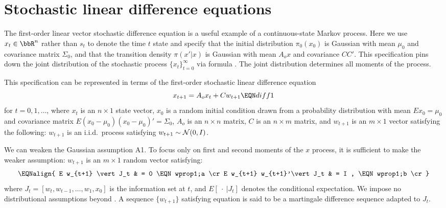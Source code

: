 \section{Stochastic linear difference equations}\label{sec:stochlinear}%
   The first-order linear vector stochastic difference equation
is a  useful example of a continuous-state Markov process.
Here we  use
$x_t \in {\bbR}^n$   rather than $s_t$ to denote the time $t$ state
and
specify that the initial distribution   $\pi_0(x_0)$ is Gaussian with mean
$\mu_0$ and covariance matrix $\Sigma_0$, and that
the transition density $\pi(x'|x) $ is Gaussian with
mean $A_o x$ and covariance $C C'$.
This specification pins down the joint distribution of the
stochastic process $\{x_t\}_{t=0}^\infty$ via formula
.
The joint distribution determines
all  moments of the process.

This specification can be represented in terms of
the first-order stochastic linear difference equation
$$ x_{t+1} = A_o x_t + C  w_{t+1} \EQN diff1 $$
for $t = 0, 1 ,\ldots$,
where $x_t$ is an $n \times 1$ state vector, $x_0$ is a random
initial condition drawn from a probability distribution with mean $E x_0 = \mu_0$
and covariance matrix $E (x_0 - \mu_0)(x_0 - \mu_0)' = \Sigma_0$,
$A_o$ is an $n \times n$ matrix, $C$ is an $n \times m$
matrix, and  $w_{t+1}$ is an $m \times 1$   vector satisfying
 the following:
\medskip
{}  $w_{t+1}$ is an  i.i.d.\ process satisfying
 $w_{t+1} \sim {\cal N}(0, I)$.

\medskip

We can weaken the Gaussian assumption A1.
 To focus only on first and second moments of the $x$ process,
it is sufficient to make the weaker assumption:
\medskip
{} $w_{t+1}$ is an $m \times 1$ random vector
satisfying:
$$ \EQNalign{ E w_{t+1} \vert J_t & = 0 \EQN wprop1;a \cr
              E w_{t+1} w_{t+1}'\vert J_t & = I , \EQN wprop1;b \cr}$$
where %
$J_t = [w_t, w_{t-1}, \ldots, w_1, x_0]$
is the information set at $t$, and $E [ \ \cdot \ | J_t]$ denotes
the conditional expectation.  We impose no distributional
assumptions beyond .  A sequence $\{w_{t+1}\}$
satisfying equation  is said to be a martingale
difference sequence adapted to $J_t$.
%


